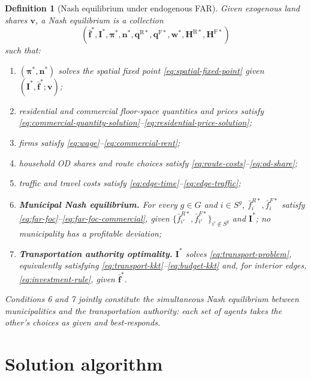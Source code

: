\documentclass[12pt,a4paper]{article}
\newtheorem{definition}{Definition}
\newcommand{\R}{\mathrm{R}}
\newcommand{\F}{\mathrm{F}}
\newcommand{\1}{\mathbb 1}
\begin{document}
\begin{definition}[Nash equilibrium under endogenous FAR]
Given exogenous land shares $\mathbf v$, a Nash equilibrium is a collection
\[
\left(
\bar{\mathbf f}^*,
\mathbf I^*,
\boldsymbol\pi^*,
\mathbf n^*,
\mathbf q^{\R*},
\mathbf q^{\F*},
\mathbf w^*,
\mathbf H^{\R*},
\mathbf H^{\F*}
\right)
\]
such that:
\begin{enumerate}
\item $(\boldsymbol\pi^*,\mathbf n^*)$ solves the spatial fixed point \eqref{eq:spatial-fixed-point} given $(\mathbf I^*,\bar{\mathbf f}^*;\mathbf v)$;
\item residential and commercial floor-space quantities and prices satisfy \eqref{eq:commercial-quantity-solution}--\eqref{eq:residential-price-solution};
\item firms satisfy \eqref{eq:wage}--\eqref{eq:commercial-rent};
\item household OD shares and route choices satisfy \eqref{eq:route-costs}--\eqref{eq:od-share};
\item traffic and travel costs satisfy \eqref{eq:edge-time}--\eqref{eq:edge-traffic};
\item \textbf{Municipal Nash equilibrium.} For every $g\in G$ and $i\in S^g$, $\bar f_i^{R*},\bar f_i^{F*}$ satisfy \eqref{eq:far-foc}--\eqref{eq:far-foc-commercial}, given $\{\bar f_{i'}^{R*},\bar f_{i'}^{F*}\}_{i'\notin S^g}$ and $\mathbf I^*$; no municipality has a profitable deviation;
\item \textbf{Transportation authority optimality.} $\mathbf I^*$ solves \eqref{eq:transport-problem}, equivalently satisfying \eqref{eq:transport-kkt}--\eqref{eq:budget-kkt} and, for interior edges, \eqref{eq:investment-rule}, given $\bar{\mathbf f}^*$.
\end{enumerate}
Conditions 6 and 7 jointly constitute the simultaneous Nash equilibrium between municipalities and the transportation authority: each set of agents takes the other's choices as given and best-responds.
\end{definition}

\section{Solution algorithm}
\end{document}
